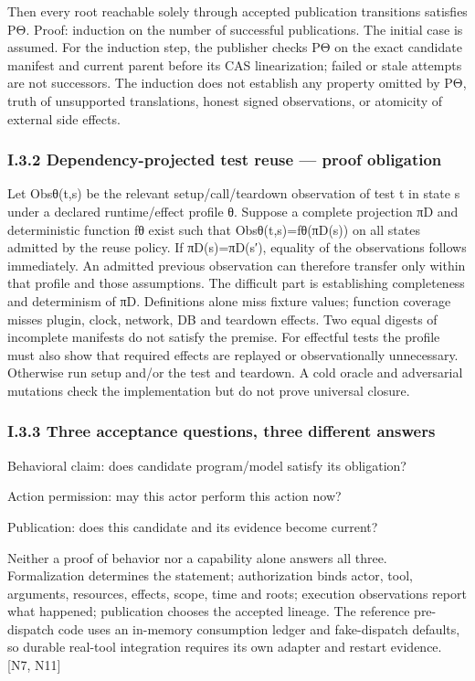 \documentclass{article}
\begin{document}
Then every root reachable solely through accepted publication transitions satisfies PΘ. Proof:
induction on the number of successful publications. The initial case is assumed. For the induction
step, the publisher checks PΘ on the exact candidate manifest and current parent before its CAS
linearization; failed or stale attempts are not successors. The induction does not establish any property
omitted by PΘ, truth of unsupported translations, honest signed observations, or atomicity of external
side effects.

\subsubsection*{I.3.2 Dependency-projected test reuse — proof obligation}
Let Obsθ(t,s) be the relevant setup/call/teardown observation of test t in state s under a declared
runtime/effect profile θ. Suppose a complete projection πD and deterministic function fθ exist such
that Obsθ(t,s)=fθ(πD(s)) on all states admitted by the reuse policy. If πD(s)=πD(s′), equality of
the observations follows immediately. An admitted previous observation can therefore transfer only
within that profile and those assumptions.
The difficult part is establishing completeness and determinism of πD. Definitions alone miss fixture
values; function coverage misses plugin, clock, network, DB and teardown effects. Two equal digests
of incomplete manifests do not satisfy the premise. For effectful tests the profile must also show that
required effects are replayed or observationally unnecessary. Otherwise run setup and/or the test
and teardown. A cold oracle and adversarial mutations check the implementation but do not prove
universal closure.

\subsubsection*{I.3.3 Three acceptance questions, three different answers}
\noindent Behavioral claim: does candidate program/model satisfy its obligation?\par
\noindent Action permission: may this actor perform this action now?\par
\noindent Publication: does this candidate and its evidence become current?\par
Neither a proof of behavior nor a capability alone answers all three. Formalization determines
the statement; authorization binds actor, tool, arguments, resources, effects, scope, time and roots;
execution observations report what happened; publication chooses the accepted lineage. The reference
pre-dispatch code uses an in-memory consumption ledger and fake-dispatch defaults, so durable
real-tool integration requires its own adapter and restart evidence. [N7, N11]
\end{document}
